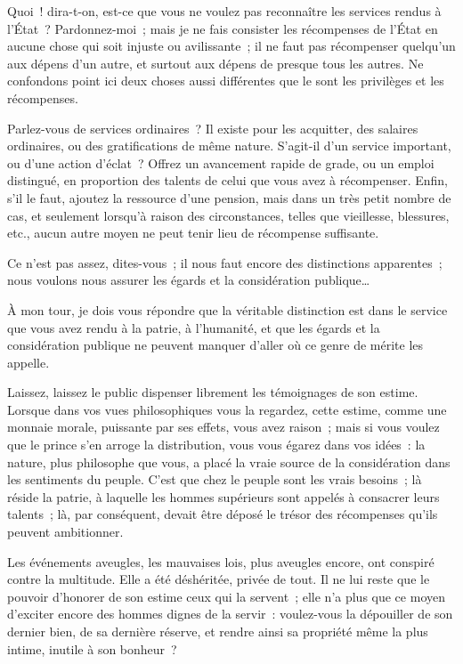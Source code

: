 \documentclass[french,twoside]{book} %
\begin{document}
Quoi ! dira-t-on, est-ce que vous ne voulez pas reconnaître les services rendus à l’État ? Pardonnez-moi ; mais je ne fais consister les récompenses de l’État en aucune chose qui soit injuste ou avilissante ; il ne faut pas récompenser quelqu’un aux dépens d’un autre, et surtout aux dépens de presque tous les autres. Ne confondons point ici deux choses aussi différentes que le sont les privilèges et les récompenses.\par
Parlez-vous de services ordinaires ? Il existe pour les acquitter, des salaires ordinaires, ou des gratifications de même nature. S’agit-il d’un service important, ou d’une action d’éclat ? Offrez un avancement rapide de grade, ou un emploi distingué, en proportion des talents de celui que vous avez à récompenser. Enfin, s’il le faut, ajoutez la ressource d’une pension, mais dans un très petit nombre de cas, et seulement lorsqu’à raison des circonstances, telles que vieillesse, blessures, etc., aucun autre moyen ne peut tenir lieu de récompense suffisante.\par
Ce n’est pas assez, dites-vous ; il nous faut encore des distinctions apparentes ; nous voulons nous assurer les égards et la considération publique…\par
À mon tour, je dois vous répondre que la véritable distinction est dans le service que vous avez rendu à la patrie, à l’humanité, et que les égards et la considération publique ne peuvent manquer d’aller où ce genre de mérite les appelle.\par
Laissez, laissez le public dispenser librement les témoignages de son estime. Lorsque dans vos vues philosophiques vous la regardez, cette estime, comme une monnaie morale, puissante par ses effets, vous avez raison ; mais si vous voulez que le prince s’en arroge la distribution, vous vous égarez dans vos idées : la nature, plus philosophe que vous, a placé la vraie source de la considération dans les sentiments du peuple. C’est que chez le peuple sont les vrais besoins ; là réside la patrie, à laquelle les hommes supérieurs sont appelés à consacrer leurs talents ; là, par conséquent, devait être déposé le trésor des récompenses qu’ils peuvent ambitionner.\par
Les événements aveugles, les mauvaises lois, plus aveugles encore, ont conspiré contre la multitude. Elle a été déshéritée, privée de tout. Il ne lui reste que le pouvoir d’honorer de son estime ceux qui la servent ; elle n’a plus que ce moyen d’exciter encore des hommes dignes de la servir : voulez-vous la dépouiller de son dernier bien, de sa dernière réserve, et rendre ainsi sa propriété même la plus intime, inutile à son bonheur ?\par
\end{document}
